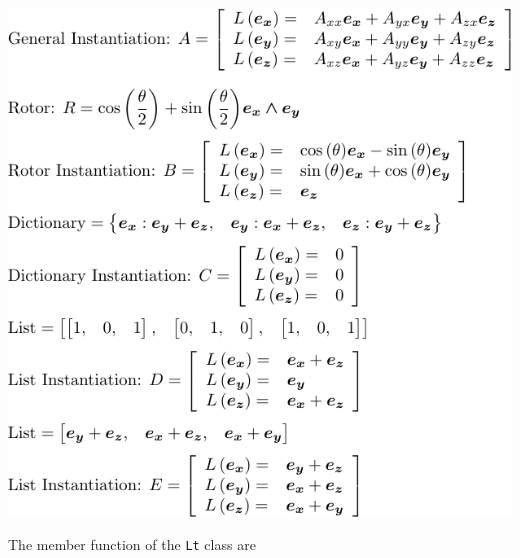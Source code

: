 \documentclass[12pt]{report}
\newcommand{\T}[1]{\texttt{#1}}
\begin{document}
\begin{center}
    \includegraphics[scale=1]{python/LtransInst.pdf}
\end{center}
The member function of the \T{Lt} class are
\end{document}
